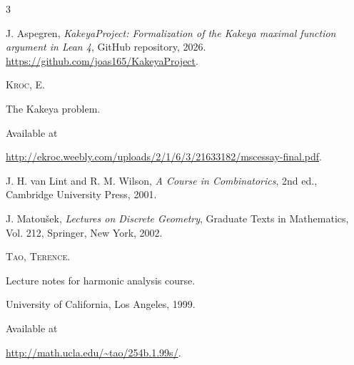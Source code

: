 \documentclass[11pt, letterpaper]{nyjm}
\begin{document}
	\begin{thebibliography}{3}
		
		J. Aspegren,
		\emph{KakeyaProject: Formalization of the Kakeya maximal function argument in Lean 4},
		GitHub repository, 2026.
		\url{https://github.com/joas165/KakeyaProject}.
		
		
		
		{\scshape Kroc, E.} 
		
		The Kakeya problem. 
		
		Available at 
		
		\url{http://ekroc.weebly.com/uploads/2/1/6/3/21633182/mscessay-final.pdf}.
		
		J. H. van Lint and R. M. Wilson,
		\textit{A Course in Combinatorics},
		2nd ed., Cambridge University Press, 2001.
		
		J. Matou\v{s}ek,
		\textit{Lectures on Discrete Geometry},
		Graduate Texts in Mathematics, Vol. 212,
		Springer, New York, 2002.
		
		
		{\scshape Tao, Terence.}
		
		Lecture notes for harmonic analysis course. 
		
		University of California, Los Angeles, 1999. 
		
		Available at 
		
		\url{http://math.ucla.edu/~tao/254b.1.99s/}.
		
		
		
		
	\end{thebibliography}
	
	
	
\end{document}

